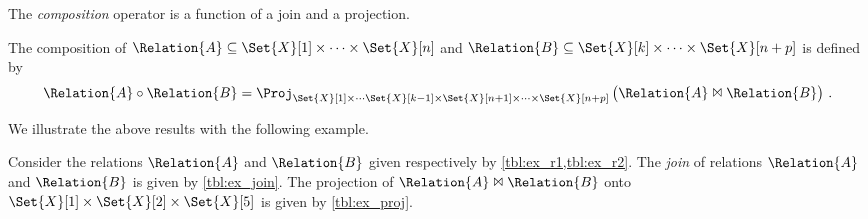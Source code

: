 \documentclass[ ../main.tex]{subfiles}
\begin{document}
The \emph{composition} operator is a function of a join and a projection.
\begin{definition}
The composition of $\Relation{A} \subseteq \Set{X}[1] \times \cdots \times \Set{X}[n]$ and $\Relation{B} \subseteq \Set{X}[k] \times \cdots \times \Set{X}[n+p]$ is defined by
\begin{equation}
    \Relation{A} \circ \Relation{B} = \Proj_{\Set{X}[1] \times \cdots \Set{X}[k-1] \times \Set{X}[n+1] \times \cdots \times \Set{X}[n+p]}\left(
        \Relation{A} \Join \Relation{B}
    \right)\,.
\end{equation}
\end{definition}

We illustrate the above results with the following example.
\begin{example}
Consider the relations $\Relation{A}$ and $\Relation{B}$ given respectively by \cref{tbl:ex_r1,tbl:ex_r2}. The \emph{join} of relations $\Relation{A}$ and $\Relation{B}$ is given by \cref{tbl:ex_join}. The projection of $\Relation{A} \Join \Relation{B}$ onto $\Set{X}[1] \times \Set{X}[2] \times \Set{X}[5]$ is given by \cref{tbl:ex_proj}.


\end{example}
\end{document}
